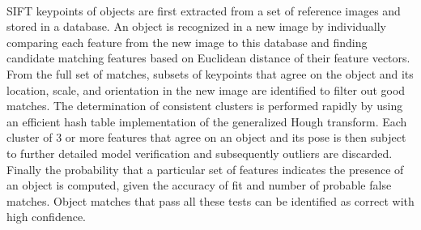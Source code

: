 \documentclass[12pt]{article}
\begin{document}
\paragraph{}
SIFT keypoints of objects are first extracted from a set of reference images and stored in a database. An object is recognized in a new image by individually comparing each feature from the new image to this database and finding candidate matching features based on Euclidean distance of their feature vectors. From the full set of matches, subsets of keypoints that agree on the object and its location, scale, and orientation in the new image are identified to filter out good matches. The determination of consistent clusters is performed rapidly by using an efficient hash table implementation of the generalized Hough transform. Each cluster of 3 or more features that agree on an object and its pose is then subject to further detailed model verification and subsequently outliers are discarded. Finally the probability that a particular set of features indicates the presence of an object is computed, given the accuracy of fit and number of probable false matches. Object matches that pass all these tests can be identified as correct with high confidence.
\end{document}
